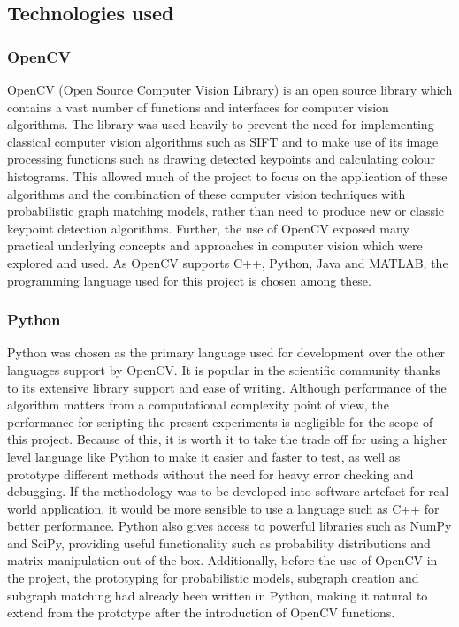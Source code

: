 \subsection{Technologies used}

\subsubsection{OpenCV}
OpenCV (Open Source Computer Vision Library) \cite{opencv} is an open source library which contains a vast number of functions and interfaces for computer vision algorithms. The library was used heavily to prevent the need for implementing classical computer vision algorithms such as SIFT \cite{sift} and to make use of its image processing functions such as drawing detected keypoints and calculating colour histograms. This allowed much of the project to focus on the application of these algorithms and the combination of these computer vision techniques with probabilistic graph matching models, rather than need to produce new or classic keypoint detection algorithms. Further, the use of OpenCV exposed many practical underlying concepts and approaches in computer vision which were explored and used.
\n
As OpenCV supports C++, Python, Java and MATLAB, the programming language used for this project is chosen among these.

\subsubsection{Python}
Python was chosen as the primary language used for development over the other languages support by OpenCV. It is popular in the scientific community thanks to its extensive library support and ease of writing. Although performance of the algorithm matters from a computational complexity point of view, the performance for scripting the present experiments is negligible for the scope of this project. Because of this, it is worth it to take the trade off for using a higher level language like Python to make it easier and faster to test, as well as prototype different methods without the need for heavy error checking and debugging. If the methodology was to be developed into software artefact for real world application, it would be more sensible to use a language such as C++ for better performance. 
\n
Python also gives access to powerful libraries such as NumPy and SciPy, providing useful functionality such as probability distributions and matrix manipulation out of the box. Additionally, before the use of OpenCV in the project, the prototyping for probabilistic models, subgraph creation and subgraph matching had already been written in Python, making it natural to extend from the prototype after the introduction of OpenCV functions. 

